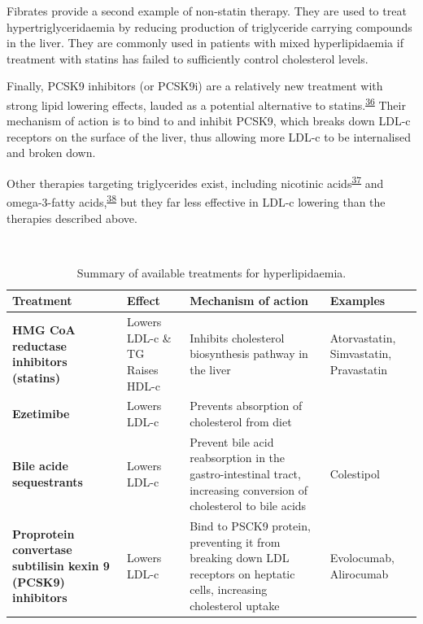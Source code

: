 \documentclass[a4paper, twoside]{templates/ociamthesis}
\begin{document}
Fibrates provide a second example of non-statin therapy. They are used to treat hypertriglyceridaemia by reducing production of triglyceride carrying compounds in the liver. They are commonly used in patients with mixed hyperlipidaemia if treatment with statins has failed to sufficiently control cholesterol levels.

Finally, PCSK9 inhibitors (or PCSK9i) are a relatively new treatment with strong lipid lowering effects, lauded as a potential alternative to statins.\textsuperscript{\protect\hyperlink{ref-chaudhary2017}{36}} Their mechanism of action is to bind to and inhibit PCSK9, which breaks down LDL-c receptors on the surface of the liver, thus allowing more LDL-c to be internalised and broken down.

Other therapies targeting triglycerides exist, including nicotinic acids\textsuperscript{\protect\hyperlink{ref-mckenney2004new}{37}} and omega-3-fatty acids,\textsuperscript{\protect\hyperlink{ref-skulas-rayannc.2019}{38}} but they far less effective in LDL-c lowering than the therapies described above.

~



\begin{table}[H]

\caption{\label{tab:lipidTreatments-table}Summary of available treatments for hyperlipidaemia.}
\centering
\begin{tabular}[t]{>{\raggedright\arraybackslash}p{8em}>{\raggedright\arraybackslash}p{8em}>{\raggedright\arraybackslash}p{8em}>{\raggedright\arraybackslash}p{8em}}
\toprule
\textbf{Treatment} & \textbf{Effect} & \textbf{Mechanism of action} & \textbf{Examples}\\
\midrule
\textbf{HMG CoA reductase inhibitors (statins)} & Lowers LDL-c \& TG \newline Raises HDL-c & Inhibits cholesterol biosynthesis pathway in the liver & Atorvastatin, \newline Simvastatin, \newline Pravastatin\\
\midrule
\textbf{Ezetimibe} & Lowers LDL-c & Prevents absorption of cholesterol from diet & \\
\midrule
\textbf{Bile acide sequestrants} & Lowers LDL-c & Prevent bile acid reabsorption in the gastro-intestinal tract, increasing conversion of cholesterol to bile acids & Colestipol\\
\midrule
\textbf{Proprotein convertase subtilisin kexin 9 (PCSK9) inhibitors} & Lowers LDL-c & Bind to PSCK9 protein, preventing it from breaking down LDL receptors on heptatic cells, increasing cholesterol uptake & Evolocumab, \newline Alirocumab\\
\bottomrule
\end{tabular}
\end{table}
\end{document}
